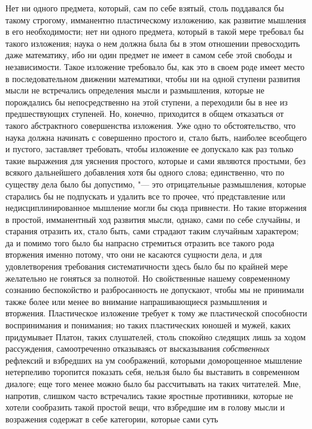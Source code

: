Нет ни одного предмета, который, сам по себе взятый, столь поддавался бы такому
строгому, имманентно пластическому изложению, как развитие мышления в его
необходимости; нет ни одного предмета, который в такой мере требовал бы такого
изложения; наука о нем должна была бы в этом отношении превосходить даже
математику, ибо ни один предмет не имеет в самом себе этой свободы и
независимости. Такое изложение требовало бы, как это в своем роде имеет место в
последовательном движении математики, чтобы ни на одной ступени развития мысли
не встречались определения мысли и размышления, которые не порождались бы
непосредственно на этой ступени, а переходили бы в нее из предшествующих
ступеней. Но, конечно, приходится в общем отказаться от такого абстрактного
совершенства изложения. Уже одно то обстоятельство, что наука должна начинать с
совершенно простого и, стало быть, наиболее всеобщего и пустого, заставляет
требовать, чтобы изложение ее допускало как раз только такие выражения для
уяснения простого, которые и сами являются простыми, без всякого дальнейшего
добавления хотя бы одного слова; единственно, что по существу дела было бы
допустимо, "--- это отрицательные размышления, которые старались бы не
подпускать и удалить все то прочее, чт\'{о} представление или
недисциплинированное мышление могли бы сюда привнести. Но такие вторжения в
простой, имманентный ход развития мысли, однако, сами по себе случайны, и
старания отразить их, стало быть, сами страдают таким случайным характером; да
и помимо того было бы напрасно стремиться отразить все такого рода вторжения
именно потому, что они не касаются сущности дела, и для удовлетворения
требования систематичности здесь было бы по крайней мере желательно не гоняться
за полнотой. Но свойственные нашему современному сознанию беспокойство и
разбросанность не допускают, чтобы мы не принимали также более или менее во
внимание напрашивающиеся размышления и вторжения. Пластическое изложение
требует к тому же пластической способности воспринимания и понимания; но таких
пластических юношей и мужей, каких придумывает Платон, таких слушателей, столь
спокойно следящих лишь за ходом рассуждения, самоотреченно отказываясь от
высказывания {\em собственных} рефлексий и взбредших на ум соображений,
которыми доморощенное мышление нетерпеливо торопится показать себя, нельзя было
бы выставить в современном диалоге; еще того менее можно было бы рассчитывать
на таких читателей. Мне, напротив, слишком часто встречались такие яростные
противники, которые не хотели сообразить такой простой вещи, что взбредшие им в
голову мысли и возражения содержат в себе категории, которые сами суть
